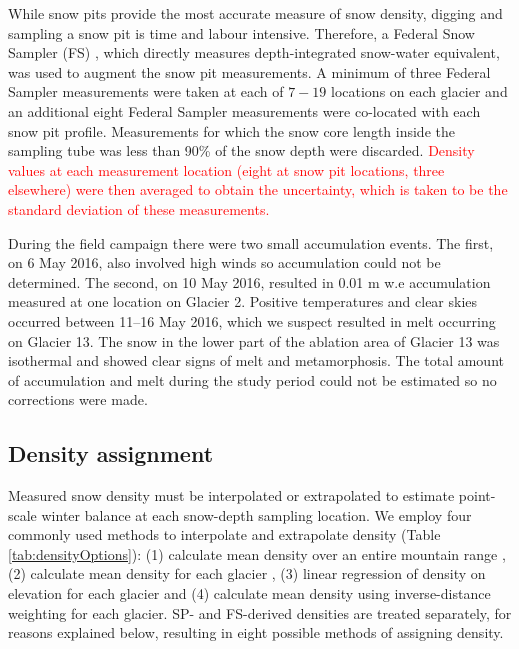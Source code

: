 \documentclass[review,oneside, letterpaper]{igs}
\begin{document}
While snow pits provide the most accurate measure of snow density, digging and sampling a snow pit is time and labour intensive. Therefore, a Federal Snow Sampler (FS) \citep{Clyde1932}, which directly measures depth-integrated snow-water equivalent, was used to augment the snow pit measurements. A minimum of three Federal Sampler measurements were taken at each of $7-19$ locations on each glacier and an additional eight Federal Sampler measurements were co-located with each snow pit profile. Measurements for which the snow core length inside the sampling tube was less than 90\% of the snow depth were discarded. \textcolor{red}{Density values at each measurement location (eight at snow pit locations, three elsewhere) were then averaged to obtain the uncertainty, which is taken to be the standard deviation of these measurements.}

During the field campaign there were two small accumulation events. The first, on 6 May 2016, also involved high winds so accumulation could not be determined. The second, on 10 May 2016, resulted in 0.01 m w.e accumulation measured at one location on Glacier 2. Positive temperatures and clear skies occurred between 11--16 May 2016, which we suspect resulted in melt occurring on Glacier 13. The snow in the lower part of the ablation area of Glacier 13 was isothermal and showed clear signs of melt and metamorphosis. The total amount of accumulation and melt during the study period could not be estimated so no corrections were made. 

\subsection{Density assignment}

Measured snow density must be interpolated or extrapolated to estimate point-scale winter balance at each snow-depth sampling location. We employ four commonly used methods to interpolate and extrapolate density (Table \ref{tab:densityOptions}): (1) calculate mean density over an entire mountain range \citep[e.g.][]{Cullen2017}, (2) calculate mean density for each glacier \citep[e.g.][]{Elder1991, McGrath2015}, (3) linear regression of density on elevation for each glacier \citep[e.g.][]{Elder1998, Molotch2005} and (4) calculate mean density using inverse-distance weighting \citep[e.g.][]{Molotch2005} for each glacier.  SP- and FS-derived densities are treated separately, for reasons explained below, resulting in eight possible methods of assigning density.
\end{document}
